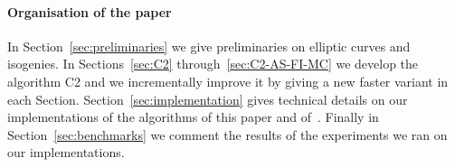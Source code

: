 \paragraph{Organisation of the paper}
In Section~\ref{sec:preliminaries} we give preliminaries on elliptic
curves and isogenies. In Sections~\ref{sec:C2}
through~\ref{sec:C2-AS-FI-MC} we develop the algorithm C2 and we
incrementally improve it by giving a new faster variant in each
Section. Section~\ref{sec:implementation} gives technical details on
our implementations of the algorithms of this paper and
of~\cite{LeSi09}. Finally in Section~\ref{sec:benchmarks} we comment
the results of the experiments we ran on our implementations.



%
